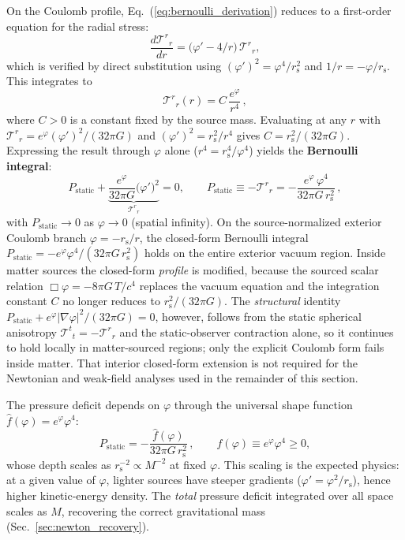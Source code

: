 \documentclass[aps,prd,onecolumn,superscriptaddress,nofootinbib,showpacs,12pt,notitlepage]{revtex4-2}
\newcommand{\rs}{r_{\mathrm{s}}}
\begin{document}
On the Coulomb profile, Eq.~(\ref{eq:bernoulli_derivation})
reduces to a first-order equation for the radial stress:
\begin{equation}\label{eq:conservation_ode}
  \frac{d\mathcal{T}^r{}_r}{dr}
  = \bigl(\varphi' - 4/r\bigr)\,\mathcal{T}^r{}_r,
\end{equation}
which is verified by direct substitution using
$(\varphi')^2 = \varphi^4/\rs^2$ and $1/r = -\varphi/\rs$.
This integrates to
\begin{equation}
  \mathcal{T}^r{}_r(r)
  = C\,\frac{e^{\varphi}}{r^4}\,,
\end{equation}
where $C > 0$ is a constant fixed by the source mass.
Evaluating at any $r$ with $\mathcal{T}^r{}_r
= e^{\varphi}(\varphi')^2/(32\pi G)$
and $(\varphi')^2 = \rs^2/r^4$ gives $C = \rs^2/(32\pi G)$.
Expressing the result through $\varphi$ alone
($r^4 = \rs^4/\varphi^4$) yields the
\textbf{Bernoulli integral}:
\begin{equation}\label{eq:bernoulli_integral}
  P_{\mathrm{static}}
  + \underbrace{\frac{e^{\varphi}}{32\pi G}
    \bigl(\varphi'\bigr)^2}_{\mathcal{T}^r{}_r}
  = 0, \qquad
  P_{\mathrm{static}}
  \equiv -\mathcal{T}^r{}_r
  = -\frac{e^{\varphi}\,\varphi^4}{32\pi G\,\rs^2}\,,
\end{equation}
with $P_{\mathrm{static}} \to 0$ as $\varphi \to 0$
(spatial infinity).  On the source-normalized exterior Coulomb
branch $\varphi = -\rs/r$, the closed-form Bernoulli integral
$P_{\mathrm{static}}=-e^\varphi\varphi^4/(32\pi G\,\rs^2)$
holds on the entire exterior vacuum region.  Inside matter
sources the closed-form \emph{profile} is modified, because
the sourced scalar relation $\Box\varphi = -8\pi G\,T/c^{4}$
replaces the vacuum equation and the integration constant
$C$ no longer reduces to $\rs^2/(32\pi G)$.  The \emph{structural}
identity
$P_{\mathrm{static}}+e^\varphi|\nabla\varphi|^{2}/(32\pi G)=0$,
however, follows from the static spherical anisotropy
$\mathcal{T}^{t}{}_{t}=-\mathcal{T}^{r}{}_{r}$ and the static-observer
contraction alone, so it continues to hold locally in
matter-sourced regions; only the explicit Coulomb form
fails inside matter.  That interior closed-form extension
is not required for the Newtonian and weak-field analyses
used in the remainder of this section.

The pressure deficit depends on $\varphi$ through the
universal shape function
$\hat{f}(\varphi) = e^{\varphi}\varphi^4$:
\begin{equation}\label{eq:f_phi_general}
  P_{\mathrm{static}}
  = -\frac{\hat{f}(\varphi)}{32\pi G\,\rs^2}\,,
  \qquad
  \hat{f}(\varphi) \equiv e^{\varphi}\varphi^4 \geq 0,
\end{equation}
whose depth scales as $\rs^{-2} \propto M^{-2}$ at fixed
$\varphi$.  This scaling is the expected physics: at a given
value of $\varphi$, lighter sources have steeper gradients
($\varphi' = \varphi^2/\rs$), hence higher kinetic-energy
density.  The \emph{total} pressure deficit integrated over
all space scales as $M$, recovering the correct gravitational
mass (Sec.~\ref{sec:newton_recovery}).
\end{document}
